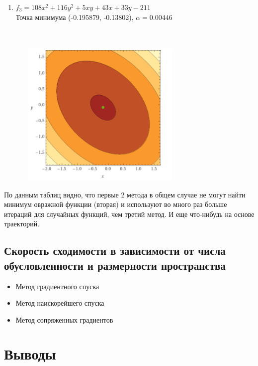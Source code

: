 \begin{enumerate}
	\item \(f_3 = 108x^2 + 116y^2 + 5xy + 43x + 33y - 211\) \\
	      Точка минимума (-0.195879, -0.13802), $\alpha = 0.00446$  \\
	      \\
	       \\
	      \begin{center}
		      \includegraphics[width=9cm, height=7cm]{img/f3.png}
	      \end{center}

\end{enumerate}

По данным таблиц видно, что первые 2 метода в общем случае не могут найти минимум овражной функции (вторая) и используют во много раз больше итераций для случайных функций, чем третий метод.
И еще что-нибудь на основе траекторий.

\subsection{Скорость сходимости в зависимости от числа обусловленности и размерности пространства}

\begin{itemize}
	\item Метод градиентного спуска

	\item Метод наискорейшего спуска

	\item Метод сопряженных градиентов
\end{itemize}

\section{Выводы}

